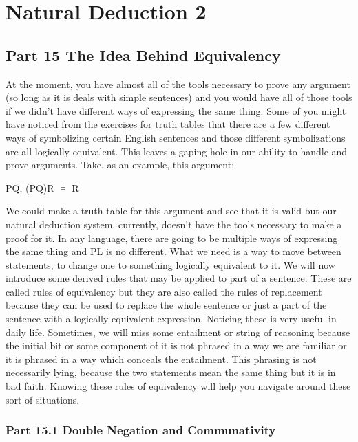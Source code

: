 \part{Natural Deduction 2}
\label{ch.plnd2}
\chapter{Part 15 The Idea Behind Equivalency}
At the moment, you have almost all of the tools necessary to prove any argument (so long as it is deals with simple sentences) and you would have all of those tools if we didn't have different ways of expressing the same thing. Some of you might have noticed from the exercises for truth tables that there are a few different ways of symbolizing certain English sentences and those different symbolizations are all logically equivalent. This leaves a gaping hole in our ability to handle and prove arguments. Take, as an example, this argument:
\begin{center}
\enot P\eor Q, (P\eif Q)\eif R $\vDash$ R
\end{center}
We could make a truth table for this argument and see that it is valid but our natural deduction system, currently, doesn't have the tools necessary to make a proof for it. In any language, there are going to be multiple ways of expressing the same thing and PL is no different. What we need is a way to move between statements, to change one to something logically equivalent to it. We will now introduce some derived rules that may be applied to part of a sentence. These are called rules of equivalency but they are also called the rules of replacement because they can be used to replace the whole sentence or just a part of the sentence with a logically equivalent expression. Noticing these is very useful in daily life. Sometimes, we will miss some entailment or string of reasoning because the initial bit or some component of it is not phrased in a way we are familiar or it is phrased in a way which conceals the entailment. This phrasing is not necessarily lying, because the two statements mean the same thing but it is in bad faith. Knowing these rules of equivalency will help you navigate around these sort of situations.  
\section{Part 15.1 Double Negation and Communativity}
